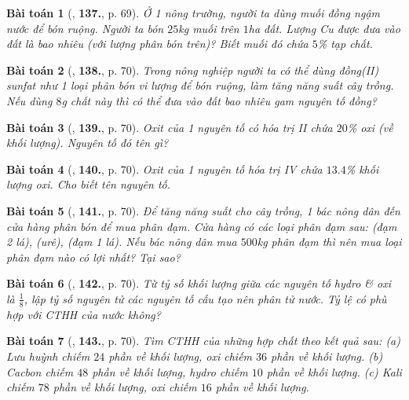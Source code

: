 \documentclass{article}
\numberwithin{equation}{section}
\newtheorem{baitoan}{Bài toán}
\begin{document}
\begin{baitoan}[\cite{An_400_BT_Hoa_Hoc_8_2020}, \textbf{137.}, p. 69]
	Ở 1 nông trường, người ta dùng muối đồng ngậm nước \emph{} để bón ruộng. Người ta bón $25$\emph{kg} muối trên $1$\emph{ha} đất. Lượng \emph{Cu} được đưa vào đất là bao nhiêu (với lượng phân bón trên)? Biết muối đó chứa $5$\% tạp chất.
\end{baitoan}

\begin{baitoan}[\cite{An_400_BT_Hoa_Hoc_8_2020}, \textbf{138.}, p. 70]
	Trong nông nghiệp người ta có thể dùng đồng(II) sunfat như 1 loại phân bón vi lượng để bón ruộng, làm tăng năng suất cây trồng. Nếu dùng $8$\emph{g} chất này thì có thể đưa vào đất bao nhiêu gam nguyên tố đồng?
\end{baitoan}

\begin{baitoan}[\cite{An_400_BT_Hoa_Hoc_8_2020}, \textbf{139.}, p. 70]
	Oxit của 1 nguyên tố có hóa trị II chứa $20$\% oxi (về khối lượng). Nguyên tố đó tên gì?
\end{baitoan}

\begin{baitoan}[\cite{An_400_BT_Hoa_Hoc_8_2020}, \textbf{140.}, p. 70]
	Oxit của 1 nguyên tố hóa trị IV chứa $13.4$\% khối lượng oxi. Cho biết tên nguyên tố.
\end{baitoan}

\begin{baitoan}[\cite{An_400_BT_Hoa_Hoc_8_2020}, \textbf{141.}, p. 70]
	Để tăng năng suất cho cây trồng, 1 bác nông dân đến cửa hàng phân bón để mua phân đạm. Cửa hàng có các loại phân đạm sau: \emph{} (đạm 2 lá), \emph{} (urê), \emph{} (đạm 1 lá). Nếu bác nông dân mua $500$\emph{kg} phân đạm thì nên mua loại phân đạm nào có lợi nhất? Tại sao?
\end{baitoan}

\begin{baitoan}[\cite{An_400_BT_Hoa_Hoc_8_2020}, \textbf{142.}, p. 70]
	Từ tỷ số khối lượng giữa các nguyên tố hydro \& oxi là $\frac{1}{8}$, lập tỷ số nguyên tử các nguyên tố cấu tạo nên phân tử nước. Tỷ lệ có phù hợp với CTHH của nước không?
\end{baitoan}

\begin{baitoan}[\cite{An_400_BT_Hoa_Hoc_8_2020}, \textbf{143.}, p. 70]
	Tìm CTHH của những hợp chất theo kết quả sau: (a) Lưu huỳnh chiếm $24$ phần về khối lượng, oxi chiếm $36$ phần về khối lượng. (b) Cacbon chiếm $48$ phần về khối lượng, hydro chiếm $10$ phần về khối lượng. (c) Kali chiếm $78$ phần về khối lượng, oxi chiếm $16$ phần về khối lượng.
\end{baitoan}
\end{document}
